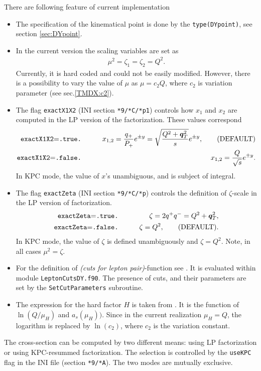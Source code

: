 \documentclass[prd,nofootinbib,eqsecnum,final]{revtex4}
\renewcommand{\(}{\left(}
\renewcommand{\)}{\right)}
\renewcommand{\[}{\left[}
\renewcommand{\]}{\right]}
\renewcommand{\vec}[1]{\bm{#1}}
\begin{document}
There are following feature of current implementation
\begin{itemize}
\item The specification of the kinematical point is done by the \texttt{type(DYpoint)}, see section \ref{sec:DYpoint}.
\item In the current version the scaling variables are set as
\begin{eqnarray}
\mu^2=\zeta_1=\zeta_2=Q^2.
\end{eqnarray}
Currently, it is hard coded and could not be easily modified. However, there is a possibility to vary the value of $\mu$ as $\mu=c_2 Q$, where $c_2$ is variation parameter (see sec.\ref{TMDX:c2}).
\item The flag \texttt{exactX1X2} (INI section \texttt{*9/*C/*p1}) controls how $x_1$ and $x_2$ are computed in the LP version of the factorization. These values correspond
\begin{eqnarray}
\text{\texttt{exactX1X2}=\texttt{.true.}}&\qquad & x_{1,2}=\frac{q_+}{P_+}e^{\pm y}=\sqrt{\frac{Q^2+\vec q_T^2}{s}}e^{\pm y},\qquad \text{(DEFAULT)}
\\
\text{\texttt{exactX1X2}=\texttt{.false.}}&\qquad & x_{1,2}=\frac{Q}{\sqrt{s}}e^{\pm y}.
\end{eqnarray}
In KPC mode, the value of $x$'s unambiguous, and is subject of integral.
\item The flag \texttt{exactZeta} (INI section \texttt{*9/*C/*p}) controls the definition of $\zeta$-scale in the LP version of factorization. 
\begin{eqnarray}
\text{\texttt{exactZeta}=\texttt{.true.}}&\qquad & \zeta=2q^+q^-=Q^2+\vec q_T^2,
\\
\text{\texttt{exactZeta}=\texttt{.false.}}&\qquad & \zeta=Q^2,\qquad \text{(DEFAULT)}.
\end{eqnarray}
In KPC mode, the value of $\zeta$ is defined unambiguously and $\zeta=Q^2$. Note, in all cases $\mu^2=\zeta$.
\item For the definition of \textit{(cuts for lepton pair)}-function see \cite{Scimemi:2017etj}. It is evaluated within module \texttt{LeptonCutsDY.f90}. The presence of cuts, and their parameters are set by the \texttt{SetCutParameters} subroutine.
\item The expression for the hard factor $H$ is taken from \cite{Gehrmann:2010ue}. It is the function of $\ln(Q/\mu_H)$ and $a_s(\mu_H))$. Since in the current realization $\mu_H=Q$, the logarithm is replaced by $\ln(c_2)$, where $c_2$ is the variation constant.
\end{itemize}
\begin{tcolorbox}
The cross-section can be computed by two different means: using LP factorization or using KPC-resummed factorization. The selection is controlled by the \texttt{useKPC} flag in the INI file (section \texttt{*9/*A}). The two modes are mutually exclusive.
\end{tcolorbox}
\end{document}
